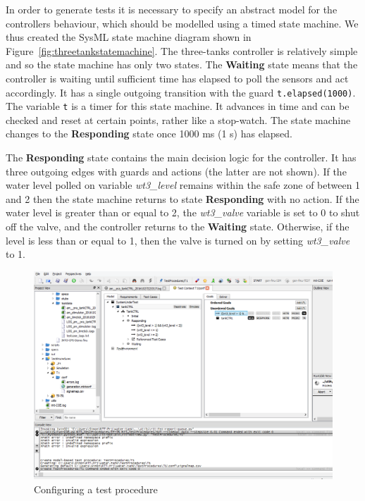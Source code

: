 In order to generate tests it is necessary to specify an abstract model for the controllers behaviour, which should be
modelled using a timed state machine. We thus created the SysML state machine diagram shown in
Figure~\ref{fig:threetankstatemachine}. The three-tanks controller is relatively simple and so the state machine has
only two states. The \textbf{Waiting} state means that the controller is waiting until sufficient time has elapsed to
poll the sensors and act accordingly. It has a single outgoing transition with the guard \texttt{t.elapsed(1000)}. The
variable \texttt{t} is a timer for this state machine. It advances in time and can be checked and reset at certain
points, rather like a stop-watch. The state machine changes to the \textbf{Responding} state once 1000 ms (1 s) has
elapsed.

The \textbf{Responding} state contains the main decision logic for the controller. It has three outgoing edges with
guards and actions (the latter are not shown). If the water level polled on variable \emph{wt3\_level} remains within
the safe zone of between 1 and 2 then the state machine returns to state \textbf{Responding} with no action. If the
water level is greater than or equal to 2, the \emph{wt3\_valve} variable is set to 0 to shut off the valve, and the
controller returns to the \textbf{Waiting} state. Otherwise, if the level is less than or equal to 1, then the valve is
turned on by setting \emph{wt3\_valve} to 1.

\begin{figure}
  \begin{center}
    \includegraphics[width=16cm]{threetank/ta_rtt2.png}
  \end{center}
  \caption{Configuring a test procedure}
  \label{fig:ta-proc}
\end{figure}

